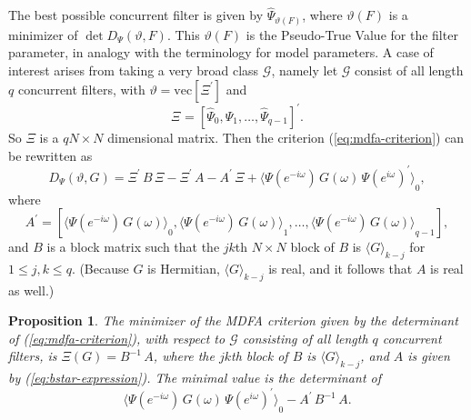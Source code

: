 \documentclass[a4paper]{book}
\newtheorem{Proposition}{Proposition}
\begin{document}
The  best possible concurrent filter is  given by
 $\widehat{\Psi}_{\vartheta (F)}$,
  where $\vartheta (F)$ is a minimizer of
  $\det D_{\Psi} (\vartheta, F)$.  This
 $\vartheta (F)$ is the
 Pseudo-True Value  for the filter parameter, in analogy with the
 terminology for model parameters.   
A   case of interest arises from taking a very broad class $\mathcal{G}$, namely
  let $\mathcal{G}$ consist of all length $q$ concurrent filters, with 
$\vartheta =  \mbox{vec} [\Xi^{\prime}]$ and 
\begin{equation}
\label{eq:conc.filter}
  \Xi^{}  =  {\left[  \widehat{\Psi}_{0}, \widehat{\Psi}_{1}, \ldots,   \widehat{\Psi}_{q-1} \right] }^{\prime}.
\end{equation}
 So $\Xi$ is  a   $ q N \times N$ dimensional matrix.  Then the criterion (\ref{eq:mdfa-criterion})
 can be rewritten as
\begin{equation}
\label{eq:mdfa-crit.linear}
 D_{\Psi} (\vartheta, G)  = \Xi^{\prime} \, B \, \Xi -
   \Xi^{\prime} \, A - 
   A^{\prime} \, \Xi + { \langle \Psi (e^{-i \omega}) \, G (\omega) \, { \Psi (e^{i \omega}) }^{\prime} \rangle }_0,
\end{equation}
 where 
\begin{equation}
 \label{eq:bstar-expression}
  A^{\prime}  = \left[ { \langle \Psi (e^{-i \omega}) \, G (\omega)  \rangle }_{0}, { \langle \Psi (e^{-i \omega}) \, G (\omega) \rangle }_{1},
  \ldots, { \langle \Psi (e^{-i \omega}) \, G (\omega) \rangle }_{q-1} \right],
\end{equation}
  and $B$ is a block matrix such that  the $jk$th $N \times N$ block of $B$  is 
  ${ \langle G \rangle }_{k-j}$ for $1 \leq j,k \leq q$.  (Because $G$ is Hermitian,
 ${ \langle G \rangle }_{k-j}$ is real, and it follows that $A$ is real as well.)



\begin{Proposition}
\label{prop:mdfa.quadsoln}
 The minimizer of the   MDFA criterion given by the determinant of (\ref{eq:mdfa-criterion}),
  with respect to $\mathcal{G}$ consisting of all length $q$ concurrent filters,  is
  $ \Xi (G) = B^{-1} \, A$,
 where the $jk$th  block of $B$   is    ${ \langle G \rangle }_{k-j}$,
 and $A$ is given by (\ref{eq:bstar-expression}).
 The minimal value is the determinant of
\begin{equation}
\label{eq:opt.val.mdfa}
{ \langle \Psi (e^{-i \omega}) \, G (\omega) \, { \Psi (e^{i \omega}) }^{\prime} \rangle }_0 - A^{\prime} \, B^{-1} \, A.
\end{equation}
\end{Proposition}
\end{document}
